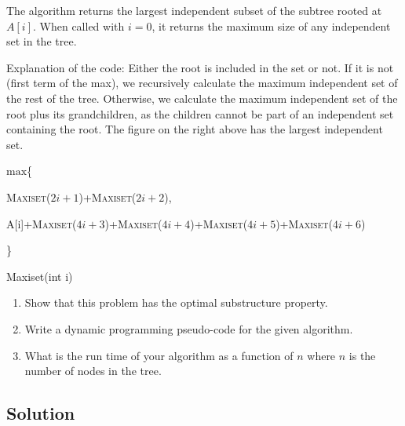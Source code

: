 The algorithm returns the largest independent subset of the subtree rooted at $A[i]$. When called with $i=0$, it returns the maximum size of any independent set in the tree.

Explanation of the code: Either the root is included in the set or not. If it is not (first term of the max), we recursively calculate the maximum independent set of the rest of the tree. Otherwise, we calculate the maximum independent set of the root plus its grandchildren, as the children cannot be part of an independent set containing the root. The figure on the right above has the largest independent set.

\begin{algorithm}[H]
\begin{algorithmic}[1]
\State {}
\EndIf
\State \Return $\text{max}$\{\par \textsc{Maxiset($2i+1$)}+\textsc{Maxiset($2i+2$)},\par A[i]+\textsc{Maxiset($4i+3$)}+\textsc{Maxiset($4i+4$)}+\textsc{Maxiset($4i+5$)}+\textsc{Maxiset($4i+6$)}\par\}
\end{algorithmic}
\caption{Maxiset(int i)}\label{alg2}
\end{algorithm}

\begin{enumerate}[label=(\alph*)]
\item Show that this problem has the optimal substructure property.
\item Write a dynamic programming pseudo-code for the given algorithm.
\item What is the run time of your algorithm as a function of $n$ where $n$ is the number of nodes in the tree.
\end{enumerate}

\subsection*{Solution}

